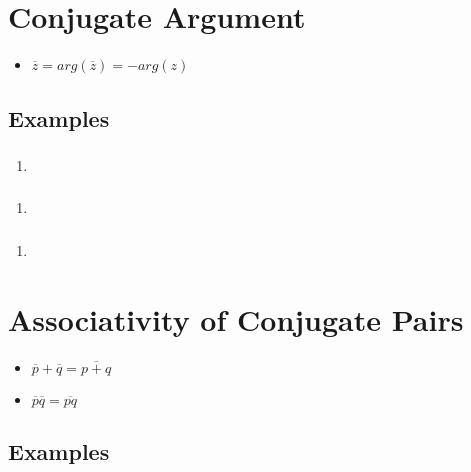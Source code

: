 \documentclass{report}
\newcommand{\conjugate}[1]{\overline{#1}}
\renewcommand{\arg}[1]{arg(#1)}
\begin{document}
        \section{Conjugate Argument}
            \begin{itemize}
                \item $\conjugate{z}=\arg{\conjugate{z}}=-\arg{z}$
            \end{itemize}
            \subsection{Examples}
                \subsubsection{}
                    \begin{enumerate}
                        \item 
                    \end{enumerate}
                \subsubsection{}
                    \begin{enumerate}
                        \item 
                    \end{enumerate}
                \subsubsection{}
                    \begin{enumerate}
                        \item 
                    \end{enumerate}
        \section{Associativity of Conjugate Pairs}
            \begin{itemize}
                \item $\conjugate{p}+\conjugate{q}=\conjugate{p+q}$
                \item $\conjugate{p}\conjugate{q}=\conjugate{pq}$
            \end{itemize}
            \subsection{Examples}
\end{document}
